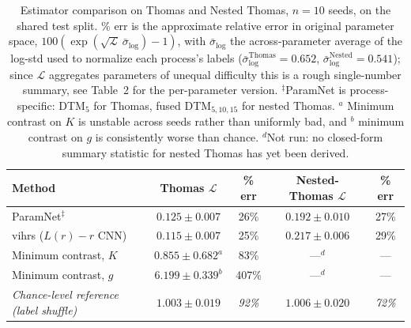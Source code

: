 \documentclass[11pt,a4paper]{article}
\begin{document}

\begin{table}[htbp]
\centering
\small
\begin{tabular}{lcccc}
\toprule
Method & Thomas $\mathcal{L}$ & \% err & Nested-Thomas $\mathcal{L}$ & \% err \\
\midrule
ParamNet$^{\ddagger}$    & $0.125 \pm 0.007$ & 26\% & $0.192 \pm 0.010$ & 27\% \\
vihrs ($L(r)-r$ CNN)     & $0.115 \pm 0.007$ & 25\% & $0.217 \pm 0.006$ & 29\% \\
Minimum contrast, $K$   & $0.855 \pm 0.682^{a}$ & 83\% & ---$^{d}$ & --- \\
Minimum contrast, $g$   & $6.199 \pm 0.339^{b}$ & 407\% & ---$^{d}$ & --- \\
\midrule
\emph{Chance-level reference (label shuffle)} & \emph{$1.003 \pm 0.019$} & \emph{92\%} & \emph{$1.006 \pm 0.020$} & \emph{72\%} \\
\bottomrule
\end{tabular}
\caption{Estimator comparison on Thomas and Nested Thomas, $n=10$ seeds, on the shared test split.
\% err is the approximate relative error in original parameter space,
$100(\exp(\sqrt{\mathcal{L}}\,\bar\sigma_{\log}) - 1)$, with $\bar\sigma_{\log}$
the across-parameter average of the log-std used to normalize each process's
labels ($\bar\sigma_{\log}^{\text{Thomas}}=0.652$,
$\bar\sigma_{\log}^{\text{Nested}}=0.541$); since $\mathcal{L}$ aggregates
parameters of unequal difficulty this is a rough single-number summary, see
Table~2 for the per-parameter version. $^{\ddagger}$ParamNet is
process-specific: DTM$_5$ for Thomas, fused
DTM$_{5,10,15}$ for nested Thomas.
$^a$ Minimum contrast on
$K$ is unstable across seeds rather than uniformly bad, and $^b$ minimum
contrast on $g$ is consistently worse than chance.
$^{d}$Not run: no closed-form summary statistic for nested Thomas
has yet been derived.}
\label{tab:classical-comparison-pct}
\end{table}
\end{document}
